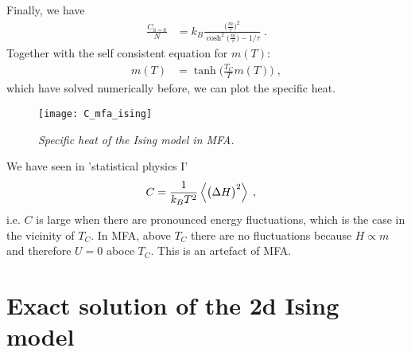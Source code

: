 %
Finally, we have 
%
\begin{align}\label{eq:}
\frac{C_{h=0}}{N} &=k_{B 	}
\frac{\big(\frac{m}{\tau}\big)^{2}}{ \cosh^{2}\big( \frac{m}{\tau} \big) - 1/\tau }\;.
\end{align}
%
%
Together with the self consistent equation for $m(T)$:
%
\begin{align*}
m(T) &= \tanh\bigg(\frac{T_{C}}{T} m(T)\bigg)\;,
\end{align*}
%
which have solved numerically before, we can plot the specific heat.
\begin{figure}[t]
\begin{center}
\texttt{[image: C\_mfa\_ising]}
\caption{{\it Specific heat of the Ising model in MFA.}}
\end{center}
\end{figure}

We have seen in  'statistical physics I' 
%
\begin{align*}
C&= \frac{1}{k_{B} T^{2}} \left\langle\big( \Delta H \big)^{2}\right\rangle\;,
\end{align*}
%
i.e. $C$ is large when there are pronounced energy fluctuations,
which is the case in the vicinity of $T_{C}$.
In  MFA, above $T_{C}$ there are no fluctuations because
$H \propto m$ and therefore $U=0$ aboce $T_{C}$.
This is an artefact of MFA.


\section{Exact solution of the 2d Ising model}
